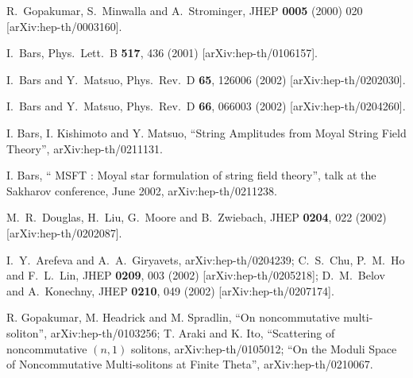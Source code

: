 \documentclass[a4paper,aps,preprint,nofootinbib,eqsecnum]{revtex4}
\begin{document}
\begin{thebibliography}{99}
 {\small R.~Gopakumar, S.~Minwalla and A.~Strominger,
JHEP \textbf{0005} (2000) 020 [arXiv:hep-th/0003160].
}

 {\small I.~Bars, %
Phys.\ Lett.\ B \textbf{517}, 436 (2001) [arXiv:hep-th/0106157].
}

 {\small I.~Bars and Y.~Matsuo,
Phys.\ Rev.\ D \textbf{65}, 126006 (2002) [arXiv:hep-th/0202030].
}

 {\small I.~Bars and Y.~Matsuo,
Phys.\ Rev.\ D \textbf{66}, 066003 (2002) [arXiv:hep-th/0204260].
}

 {\small I. Bars, I. Kishimoto and Y. Matsuo, ``String
Amplitudes from Moyal String Field Theory'', arXiv:hep-th/0211131. }

 {\small I. Bars, `` MSFT : Moyal star formulation of string
field theory'', talk at the Sakharov conference, June 2002,
arXiv:hep-th/0211238. }

 {\small M.~R.~Douglas, H.~Liu, G.~Moore and B.~Zwiebach,
JHEP \textbf{0204}, 022 (2002) [arXiv:hep-th/0202087]. }

 {\small %
I.~Y.~Arefeva and A.~A.~Giryavets,
arXiv:hep-th/0204239;\newline
%
%
C.~S.~Chu, P.~M.~Ho and F.~L.~Lin,
JHEP \textbf{0209}, 003 (2002) [arXiv:hep-th/0205218];\newline
%
%
D.~M.~Belov and A.~Konechny,
JHEP \textbf{0210}, 049 (2002) [arXiv:hep-th/0207174].
}

 {\small R. Gopakumar, M. Headrick and M.
Spradlin, ``On noncommutative multi-soliton'', arXiv:hep-th/0103256;\newline
T. Araki and K. Ito, ``Scattering of noncommutative $(n,1)$ solitons,
arXiv:hep-th/0105012; ``On the Moduli Space of Noncommutative Multi-solitons
at Finite Theta'', arXiv:hep-th/0210067. }


\end{thebibliography}
\end{document}
